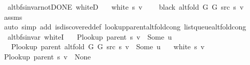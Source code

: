 \begin{isabellebody}
\endisatagproof
{\isafoldproof}%
%
\isadelimproof
\isanewline
%
\endisadelimproof
\isanewline
{}\isamarkupfalse%
\ {\isacharparenleft}{\kern0pt}\ alt{\isacharunderscore}{\kern0pt}bfs{\isacharunderscore}{\kern0pt}invar{\isacharunderscore}{\kern0pt}not{\isacharunderscore}{\kern0pt}DONE{\isacharparenright}{\kern0pt}\ whiteD{\isacharcolon}{\kern0pt}\isanewline
\ \ \ {\isachardoublequoteopen}white\ s\ v{\isachardoublequoteclose}\isanewline
\ \ \ {\isachardoublequoteopen}{\isasymnot}\ black\ {\isacharparenleft}{\kern0pt}alt{\isacharunderscore}{\kern0pt}fold\ G{}\ G{}\ src\ s{\isacharparenright}{\kern0pt}\ v{\isachardoublequoteclose}\isanewline
%
\isadelimproof
\ \ %
\endisadelimproof
%
\isatagproof
{}\isamarkupfalse%
\ assms\isanewline
\ \ \isamarkupfalse%
\ {\isacharparenleft}{\kern0pt}auto\ simp\ add{\isacharcolon}{\kern0pt}\ is{\isacharunderscore}{\kern0pt}discovered{\isacharunderscore}{\kern0pt}def\ lookup{\isacharunderscore}{\kern0pt}parent{\isacharunderscore}{\kern0pt}alt{\isacharunderscore}{\kern0pt}fold{\isacharunderscore}{\kern0pt}cong\ list{\isacharunderscore}{\kern0pt}queue{\isacharunderscore}{\kern0pt}alt{\isacharunderscore}{\kern0pt}fold{\isacharunderscore}{\kern0pt}cong{\isacharparenright}{\kern0pt}%
\endisatagproof
{\isafoldproof}%
%
\isadelimproof
\isanewline
%
\endisadelimproof
\isanewline
{}\isamarkupfalse%
\ {\isacharparenleft}{\kern0pt}\ alt{\isacharunderscore}{\kern0pt}bfs{\isacharunderscore}{\kern0pt}invar{\isacharparenright}{\kern0pt}\ whiteI{\isacharcolon}{\kern0pt}\isanewline
\ \ \ {\isachardoublequoteopen}P{\isacharunderscore}{\kern0pt}lookup\ {\isacharparenleft}{\kern0pt}parent\ s{\isacharparenright}{\kern0pt}\ v\ {\isasymnoteq}\ Some\ u{\isachardoublequoteclose}\isanewline
\ \ \ {\isachardoublequoteopen}P{\isacharunderscore}{\kern0pt}lookup\ {\isacharparenleft}{\kern0pt}parent\ {\isacharparenleft}{\kern0pt}alt{\isacharunderscore}{\kern0pt}fold\ G{}\ G{}\ src\ s{\isacharparenright}{\kern0pt}{\isacharparenright}{\kern0pt}\ v\ {\isacharequal}{\kern0pt}\ Some\ u{\isachardoublequoteclose}\isanewline
\ \ \ {\isachardoublequoteopen}white\ s\ v{\isachardoublequoteclose}\isanewline
%
\isadelimproof
%
\endisadelimproof
%
\isatagproof
{}\isamarkupfalse%
\ {\isacharminus}{\kern0pt}\isanewline
\ \ \isamarkupfalse%
\ {\isachardoublequoteopen}P{\isacharunderscore}{\kern0pt}lookup\ {\isacharparenleft}{\kern0pt}parent\ s{\isacharparenright}{\kern0pt}\ v\ {\isacharequal}{\kern0pt}\ None{\isachardoublequoteclose}\isanewline

\end{isabellebody}
